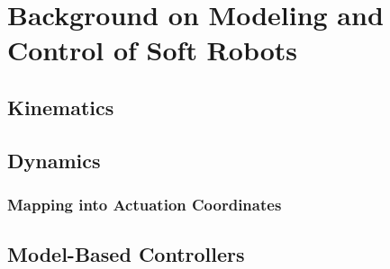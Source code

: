 \chapter{Background on Modeling and Control of Soft Robots}\label{chp:background}
\section{Kinematics}
\section{Dynamics}

\subsection{Mapping into Actuation Coordinates}

\section{Model-Based Controllers}